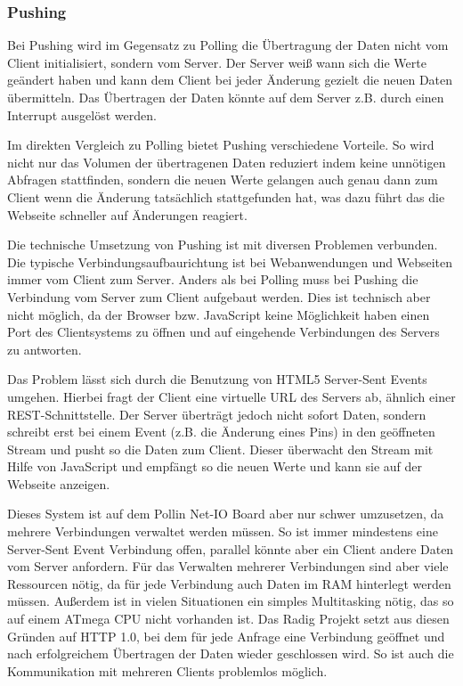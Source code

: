 \subsubsection{Pushing}
Bei Pushing wird im Gegensatz zu Polling die Übertragung der Daten nicht vom
Client initialisiert, sondern vom Server. Der Server weiß wann sich die Werte geändert haben und kann dem Client bei
jeder Änderung gezielt die neuen Daten übermitteln. Das Übertragen der Daten
könnte auf dem Server z.B. durch einen Interrupt ausgelöst werden.

Im direkten Vergleich zu Polling bietet Pushing verschiedene Vorteile. So wird nicht nur
das Volumen der übertragenen Daten reduziert indem keine unnötigen Abfragen stattfinden,
sondern die neuen Werte gelangen auch genau dann zum Client wenn die Änderung tatsächlich
stattgefunden hat, was dazu führt das die Webseite schneller auf Änderungen reagiert.

Die technische Umsetzung von Pushing ist mit diversen Problemen verbunden. Die typische
Verbindungsaufbaurichtung ist bei Webanwendungen und Webseiten immer vom Client zum
Server. Anders als bei Polling muss bei Pushing die Verbindung vom Server zum
Client aufgebaut werden. Dies ist technisch aber nicht möglich, da der Browser
bzw. JavaScript keine Möglichkeit haben einen Port des Clientsystems zu öffnen
und auf eingehende Verbindungen des Servers zu antworten.

Das Problem lässt sich durch die Benutzung von HTML5 Server-Sent Events umgehen. Hierbei
fragt der Client eine virtuelle URL des Servers ab, ähnlich einer REST-Schnittstelle. Der
Server überträgt jedoch nicht sofort Daten, sondern schreibt erst bei einem Event (z.B.
die Änderung eines Pins) in den geöffneten Stream und pusht so die Daten zum Client.
Dieser überwacht den Stream mit Hilfe von JavaScript und empfängt so die neuen Werte und
kann sie auf der Webseite anzeigen.

Dieses System ist auf dem Pollin Net-IO Board aber nur schwer umzusetzen, da
mehrere Verbindungen verwaltet werden müssen. So ist immer mindestens eine Server-Sent Event
Verbindung offen, parallel könnte aber ein Client andere Daten vom Server anfordern. Für
das Verwalten mehrerer Verbindungen sind aber viele Ressourcen nötig, da für jede
Verbindung auch Daten im RAM hinterlegt werden müssen. Außerdem ist in vielen Situationen
ein simples Multitasking nötig, das so auf einem ATmega CPU nicht vorhanden ist. Das Radig
Projekt setzt aus diesen Gründen auf HTTP 1.0, bei dem für jede Anfrage eine
Verbindung geöffnet und nach erfolgreichem Übertragen der Daten wieder geschlossen wird. So ist auch
die Kommunikation mit mehreren Clients problemlos möglich.

